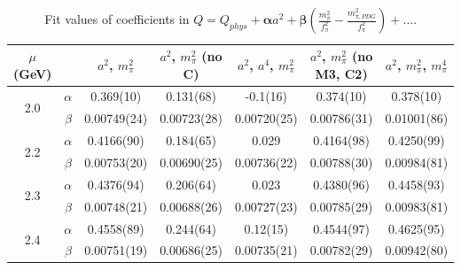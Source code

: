 \documentclass[12pt]{extarticle}
\begin{document}
\begin{table}[h!]
\begin{center}
\begin{tabular}{|c c|c|c|c|c|c|}
\hline
$\mu$ (GeV) &  & $a^2$, $m_\pi^2$& $a^2$, $m_\pi^2$ (no C)& $a^2$, $a^4$, $m_\pi^2$& $a^2$, $m_\pi^2$ (no M3, C2)& $a^2$, $m_\pi^2$, $m_\pi^4$\\
\hline
\multirow{2}{0.5in}{2.0} & $\alpha$ & 0.369(10)& 0.131(68)& -0.1(16)& 0.374(10)& 0.378(10)\\
 & $\beta$ & 0.00749(24)& 0.00723(28)& 0.00720(25)& 0.00786(31)& 0.01001(86)\\
\hline
\multirow{2}{0.5in}{2.2} & $\alpha$ & 0.4166(90)& 0.184(65)& 0.029& 0.4164(98)& 0.4250(99)\\
 & $\beta$ & 0.00753(20)& 0.00690(25)& 0.00736(22)& 0.00788(30)& 0.00984(81)\\
\hline
\multirow{2}{0.5in}{2.3} & $\alpha$ & 0.4376(94)& 0.206(64)& 0.023& 0.4380(96)& 0.4458(93)\\
 & $\beta$ & 0.00748(21)& 0.00688(26)& 0.00727(23)& 0.00785(29)& 0.00983(81)\\
\hline
\multirow{2}{0.5in}{2.4} & $\alpha$ & 0.4558(89)& 0.244(64)& 0.12(15)& 0.4544(97)& 0.4625(95)\\
 & $\beta$ & 0.00751(19)& 0.00686(25)& 0.00735(21)& 0.00782(29)& 0.00942(80)\\
\hline
\end{tabular}
\caption{Fit values of coefficients in $Q = Q_{phys} + \mathbf{\alpha} a^2 + \mathbf{\beta}\left(\frac{m_\pi^2}{f_\pi^2}-\frac{m_{\pi,PDG}^2}{f_\pi^2}\right) + \ldots$.}
\end{center}
\end{table}




















\clearpage
\end{document}
